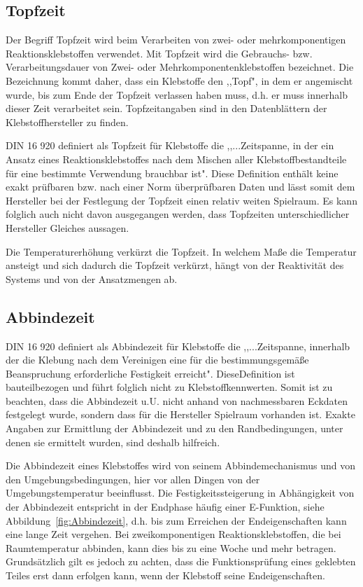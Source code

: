 \subsection{Topfzeit}
Der Begriff Topfzeit wird beim Verarbeiten von zwei- oder mehrkomponentigen Reaktionsklebstoffen verwendet. Mit Topfzeit wird die Gebrauchs- bzw. Verarbeitungsdauer von Zwei- oder Mehrkomponentenklebstoffen bezeichnet. Die Bezeichnung kommt daher, dass ein Klebstoffe den ,,Topf", in dem er angemischt wurde, bis zum Ende der Topfzeit verlassen haben muss, d.h. er muss innerhalb dieser Zeit verarbeitet sein. Topfzeitangaben sind in den Datenblättern der Klebstoffhersteller zu finden.

DIN 16 920 definiert als Topfzeit für Klebstoffe die ,,...Zeitspanne, in der ein Ansatz eines Reaktionsklebstoffes nach dem Mischen aller Klebstoffbestandteile für eine bestimmte Verwendung brauchbar ist". Diese Definition enthält keine exakt prüfbaren bzw. nach einer Norm überprüfbaren Daten und lässt somit dem Hersteller bei der Festlegung der Topfzeit einen relativ weiten Spielraum. Es kann folglich auch nicht davon ausgegangen werden, dass Topfzeiten unterschiedlicher Hersteller Gleiches aussagen.

Die Temperaturerhöhung verkürzt die Topfzeit. In welchem Maße die Temperatur ansteigt und sich dadurch die Topfzeit verkürzt, hängt von der Reaktivität des Systems und von der Ansatzmengen ab.

\subsection{Abbindezeit}
DIN 16 920 definiert als Abbindezeit für Klebstoffe die ,,...Zeitspanne, innerhalb der die Klebung nach dem Vereinigen eine für die bestimmungsgemäße Beanspruchung erforderliche Festigkeit erreicht". DieseDefinition ist bauteilbezogen und führt folglich nicht zu Klebstoffkennwerten. Somit ist zu beachten, dass die Abbindezeit u.U. nicht anhand von nachmessbaren Eckdaten festgelegt wurde, sondern dass für die Hersteller Spielraum vorhanden ist. Exakte Angaben zur Ermittlung der Abbindezeit und zu den Randbedingungen, unter denen sie ermittelt wurden, sind deshalb hilfreich.

Die Abbindezeit eines Klebstoffes wird von seinem Abbindemechanismus und von den Umgebungsbedingungen, hier vor allen Dingen von der Umgebungstemperatur beeinflusst. Die Festigkeitssteigerung in Abhängigkeit von der Abbindezeit entspricht in der Endphase häufig einer E-Funktion, siehe Abbildung~\ref{fig:Abbindezeit}, d.h. bis zum Erreichen der Endeigenschaften kann eine lange Zeit vergehen. Bei zweikomponentigen Reaktionsklebstoffen, die bei Raumtemperatur abbinden, kann dies bis zu eine Woche und mehr betragen. Grundsätzlich gilt es jedoch zu achten, dass die Funktionsprüfung eines geklebten Teiles erst dann erfolgen kann, wenn der Klebstoff seine Endeigenschaften.

